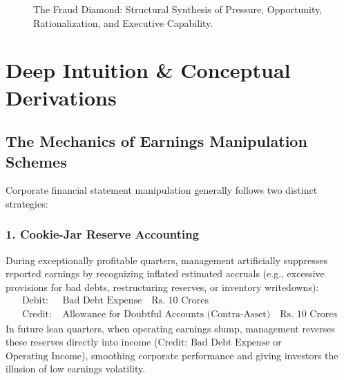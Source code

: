 \begin{figure}[htbp]
\caption{The Fraud Diamond: Structural Synthesis of Pressure, Opportunity, Rationalization, and Executive Capability.}
\label{fig:fraud_diamond}
\end{figure}

\section{Deep Intuition \& Conceptual Derivations}

\subsection{The Mechanics of Earnings Manipulation Schemes}
Corporate financial statement manipulation generally follows two distinct strategies:

\subsubsection{1. Cookie-Jar Reserve Accounting}
During exceptionally profitable quarters, management artificially suppresses reported earnings by recognizing inflated estimated accruals (e.g., excessive provisions for bad debts, restructuring reserves, or inventory writedowns):
\begin{align*}
\text{Debit: } & \text{Bad Debt Expense} \quad \text{Rs.~10 Crores} \\
\text{Credit: } & \text{Allowance for Doubtful Accounts (Contra-Asset)} \quad \text{Rs.~10 Crores}
\end{align*}
In future lean quarters, when operating earnings slump, management reverses these reserves directly into income ($\text{Credit: Bad Debt Expense}$ or $\text{Operating Income}$), smoothing corporate performance and giving investors the illusion of low earnings volatility.

